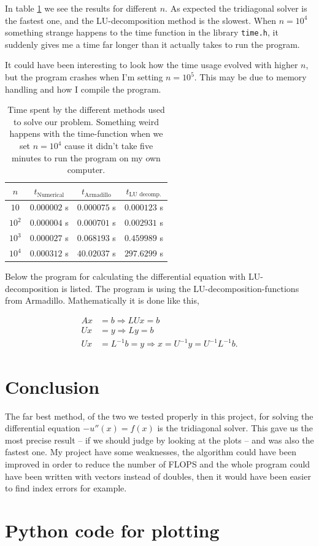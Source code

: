 \documentclass[english, 11pt]{article}
\begin{document}
In table \ref{tab:time} we see the results for different $n$. As expected the tridiagonal solver is the fastest one, and the LU-decomposition method is the slowest. When $n=10^4$ something strange happens to the time function in the library \verb|time.h|, it suddenly gives me a time far longer than it actually takes to run the program.

It could have been interesting to look how the time usage evolved with higher $n$, but the program crashes when I'm setting $n=10^5$. This may be due to memory handling and how I compile the program.

\begin{table}[H]
  \centering
  \begin{tabular}{ c c c c }
    \toprule
    $n$ & $t_{\text{Numerical}}$ & $t_{\text{Armadillo}}$ & $t_{\text{LU decomp.}}$ \\
    \midrule
	$10$   & $0.000002$ s & $0.000075$ s & $0.000123$ s \\
	$10^2$ & $0.000004$ s & $0.000701$ s & $0.002931$ s \\
	$10^3$ & $0.000027$ s & $0.068193$ s & $0.459989$ s \\
	$10^4$ & $0.000312$ s & $40.02037$ s & $297.6299$ s \\
    \bottomrule
  \end{tabular}
  \caption{Time spent by the different methods used to solve our problem. Something weird happens with the time-function when we set $n=10^4$ cause it didn't take five minutes to run the program on my own computer.}
  \label{tab:time}
\end{table}

Below the program for calculating the differential equation with LU-decomposition is listed. The program is using the LU-decomposition-functions from Armadillo. Mathematically it is done like this,

\begin{align*}
    Ax &= b \Rightarrow LUx = b \\
    Ux &= y  \Rightarrow Ly = b \\
    Ux &= L^{-1}b = y \Rightarrow x = U^{-1}y = U^{-1}L^{-1}b.
\end{align*}



\section*{Conclusion} The far best method, of the two we tested properly in this project, for solving the differential equation $-u''(x) = f(x)$ is the tridiagonal solver. This gave us the most precise result -- if we should judge by looking at the plots -- and was also the fastest one. My project have some weaknesses, the algorithm could have been improved in order to reduce the number of FLOPS and the whole program could have been written with vectors instead of doubles, then it would have been easier to find index errors for example.
\newpage

\section{Python code for plotting}

\end{document}

